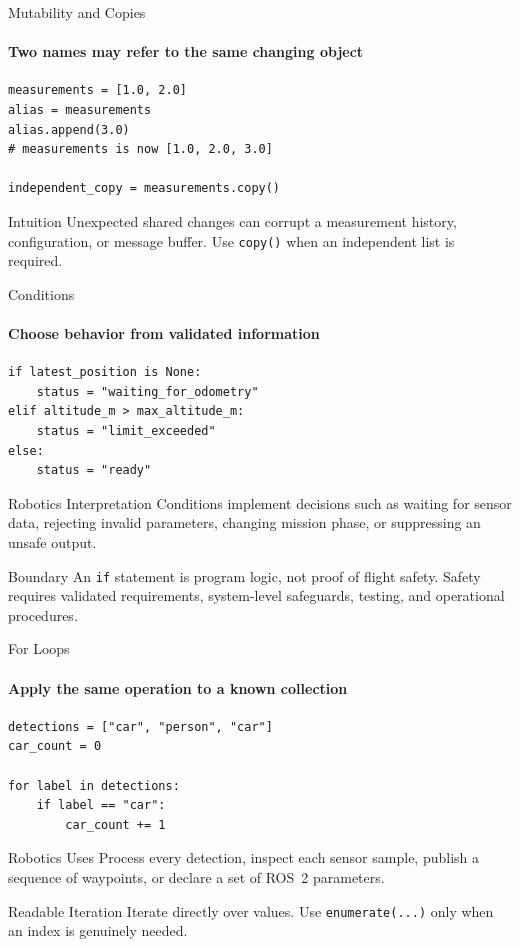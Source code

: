 \begin{frame}[fragile]{Mutability and Copies}
\framesubtitle{Two names may refer to the same changing object}
\begin{verbatim}
measurements = [1.0, 2.0]
alias = measurements
alias.append(3.0)
# measurements is now [1.0, 2.0, 3.0]

independent_copy = measurements.copy()
\end{verbatim}
\begin{alertblock}{Intuition}
Unexpected shared changes can corrupt a measurement history, configuration, or message buffer. Use \texttt{copy()} when an independent list is required.
\end{alertblock}
\end{frame}


\begin{frame}[fragile]{Conditions}
\framesubtitle{Choose behavior from validated information}
\begin{verbatim}
if latest_position is None:
    status = "waiting_for_odometry"
elif altitude_m > max_altitude_m:
    status = "limit_exceeded"
else:
    status = "ready"
\end{verbatim}
\begin{block}{Robotics Interpretation}
Conditions implement decisions such as waiting for sensor data, rejecting invalid parameters, changing mission phase, or suppressing an unsafe output.
\end{block}
\begin{alertblock}{Boundary}
An \texttt{if} statement is program logic, not proof of flight safety. Safety requires validated requirements, system-level safeguards, testing, and operational procedures.
\end{alertblock}
\end{frame}

\begin{frame}[fragile]{For Loops}
\framesubtitle{Apply the same operation to a known collection}
\begin{verbatim}
detections = ["car", "person", "car"]
car_count = 0

for label in detections:
    if label == "car":
        car_count += 1
\end{verbatim}
\begin{exampleblock}{Robotics Uses}
Process every detection, inspect each sensor sample, publish a sequence of waypoints, or declare a set of ROS~2 parameters.
\end{exampleblock}
\begin{block}{Readable Iteration}
Iterate directly over values. Use \texttt{enumerate(...)} only when an index is genuinely needed.
\end{block}
\end{frame}

